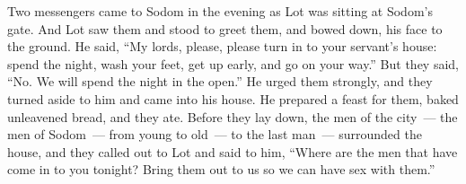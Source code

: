 
\begin{inparaenum}
     Two messengers came to Sodom in the evening as Lot was sitting at Sodom's gate. And Lot saw them and stood to greet them, and bowed down, his face to the ground.%
     He said, ``My lords, please, please turn in to your servant's house: spend the night, wash your feet, get up early, and go on your way.'' But they said, ``No. We will spend the night in the open.''%
     He urged them strongly, and they turned aside to him and came into his house. He prepared a feast for them, baked unleavened bread, and they ate.%
     Before they lay down, the men of the city~--- the men of Sodom~--- from young to old~--- to the last man~--- surrounded the house,%
     and they called out to Lot and said to him, ``Where are the men that have come in to you tonight? Bring them out to us so we can have sex with them.''%
    
\end{inparaenum}
